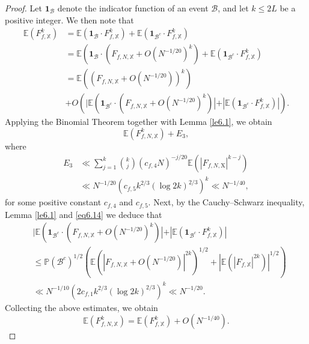 \documentclass[10pt,a4paper]{amsart}
\begin{document}
\begin{proof}
Let $\mathbf{1}_{\mathcal{B}}$ denote the indicator function of an event $\mathcal{B}$, and let $k \leqslant 2L$ be a positive integer. We then note that
\[
\begin{aligned}
\mathbb{E}\left(F_{f,\mathbb{X}}^k\right) & =\mathbb{E}\left(\mathbf{1}_{\mathcal{B}} \cdot F_{f,\mathbb{X}}^k\right)+\mathbb{E}\left(\mathbf{1}_{\mathcal{B}^c} \cdot F_{f,\mathbb{X}}^k\right) \\
& =\mathbb{E}\left(\mathbf{1}_{\mathcal{B}} \cdot\left(F_{f,N, \mathbb{X}}+O\left(N^{-1 / 20}\right)^k\right)+\mathbb{E}\left(\mathbf{1}_{\mathcal{B}^c} \cdot F_{f,\mathbb{X}}^k\right)\right. \\
& =\mathbb{E}\left(\left(F_{f,N, \mathbb{X}}+O\left(N^{-1 / 20}\right)\right)^k\right)\\
&+O\left(\mid \mathbb{E}\left(\mathbf{1}_{\mathcal{B}^c} \cdot\left(F_{f,N, \mathbb{X}}+O\left(N^{-1 / 20}\right)^k\right)\left|+\left|\mathbb{E}\left(\mathbf{1}_{\mathcal{B}^c} \cdot F_{f,\mathbb{X}}^k\right)\right|\right.\right.\right) .
\end{aligned}
\]
 Applying the Binomial Theorem together with Lemma \ref{le6.1}, we obtain
\[
\mathbb{E}\left(F_{f,N, \mathbb{X}}^k\right)+E_3,
\]
where
\[
\begin{aligned}
    E_3 &\ll \sum_{j=1}^k\binom{k}{j}\left(c_{f,4} N\right)^{-j / 20} \mathbb{E}\left(\left|F_{f,N, \mathrm{X}}\right|^{k-j}\right)\\
    &\ll N^{-1 / 20}\left(c_{f,5} k^{2 / 3}\left(\log 2k\right)^{2/3}\right)^k \ll N^{-1 / 40},
\end{aligned}
\]
for some positive constant $c_{f,4}$ and $c_{f,5}$. Next, by the Cauchy--Schwarz inequality, Lemma \ref{le6.1} and  \eqref{eq6.14} we deduce that
\[
\begin{aligned}
& \mid \mathbb{E}\left(\boldsymbol{1}_{\mathcal {B}^{c}}\cdot (F_{f, N,\mathbb{X}}+O(N^{-1/20} )^{k} ) \left|+\left|\mathbb{E}\left(\mathbf{1}_{\mathcal{B}^c} \cdot F_{f,\mathbb{X}}^k\right)\right|\right.\right. \\
& \leqslant \mathbb{P}\left(\mathcal{B}^c\right)^{1 / 2}\left(\mathbb{E}\left(\left|F_{f,N, \mathbb{X}}+O\left(N^{-1/20}\right)\right|^{2 k}\right)^{1 / 2}+\left|\mathbb{E}\left(\left|F_{f,\mathbb{X}}\right|^{2 k}\right)\right|^{1 / 2}\right) \\
& \ll N^{-1 / 10}\left(2c_{f,1} k^{2 / 3}\left(\log 2k\right)^{2/3}\right)^k \ll N^{-1 / 20} .
\end{aligned}
\]
Collecting the above estimates, we obtain
\[
\mathbb{E}\left(F_{f,N, \mathbb{X}}^k\right)=\mathbb{E}\left(F_{f,\mathbb{X}}^k\right)+O\left(N^{-1 / 40}\right) .
\]
\end{proof}
\end{document}
